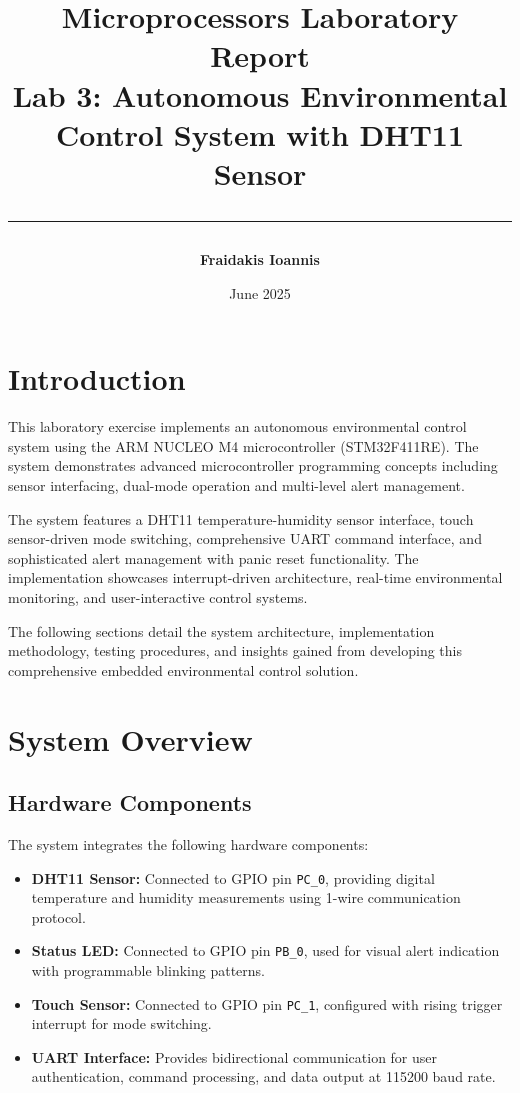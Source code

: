 \documentclass[12pt,a4paper]{article}
\title{
    \vspace*{2cm}
    \Huge\textbf{\textsf{Microprocessors Laboratory Report}}\\
    \vspace{0.4cm}
    \Large\textsf{Lab 3: Autonomous Environmental Control System with DHT11 Sensor}
    \vspace{1cm}
    \rule{\textwidth}{1pt}
}
\author{
    \Large\begin{tabular}{rl}
        \textbf{Fraidakis Ioannis}\\
    \end{tabular}
}
\date{\Large\textsf{June 2025}}
\begin{document}
\maketitle

\section{Introduction}

\begin{tcolorbox}[mybox]
This laboratory exercise implements an autonomous environmental control system using the ARM NUCLEO M4 microcontroller (STM32F411RE). The system demonstrates advanced microcontroller programming concepts including sensor interfacing, dual-mode operation and multi-level alert management.

The system features a DHT11 temperature-humidity sensor interface, touch sensor-driven mode switching, comprehensive UART command interface, and sophisticated alert management with panic reset functionality. The implementation showcases interrupt-driven architecture, real-time environmental monitoring, and user-interactive control systems.

The following sections detail the system architecture, implementation methodology, testing procedures, and insights gained from developing this comprehensive embedded environmental control solution.
\end{tcolorbox}

\newpage

\section{System Overview}

\subsection{Hardware Components}
The system integrates the following hardware components:

\begin{tcolorbox}[mybox]
\begin{itemize}[label=\textcolor{myblue}{$\bullet$}, itemsep=1.5mm]
    \item \textbf{DHT11 Sensor:} Connected to GPIO pin \texttt{PC\_0}, providing digital temperature and humidity measurements using 1-wire communication protocol.
    \item \textbf{Status LED:} Connected to GPIO pin \texttt{PB\_0}, used for visual alert indication with programmable blinking patterns.
    \item \textbf{Touch Sensor:} Connected to GPIO pin \texttt{PC\_1}, configured with rising trigger interrupt for mode switching.
    \item \textbf{UART Interface:} Provides bidirectional communication for user authentication, command processing, and data output at 115200 baud rate.
\end{itemize}
\end{tcolorbox}
\end{document}
